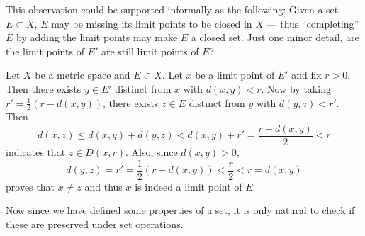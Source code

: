 This observation could be supported informally as the following:
Given a set \(E\subset X\),
\(E\) may be missing its limit points to be closed in \(X\)
---
thus ``completing'' \(E\) by adding the limit points
may make \(E\) a closed set.
Just one minor detail,
are the limit points of \(E'\) are still limit points of \(E\)?

\begin{example}
    \label{exm:limptclosed}
    Let \(X\) be a metric space and \(E\subset X\).
    Let \(x\) be a limit point of \(E'\) and fix \(r>0\).
    Then there exists \(y\in E'\) distinct from \(x\) with \(d(x,y)<r\).
    Now by taking \(r'=\frac{1}{2}(r-d(x,y))\),
    there exists \(z\in E\) distinct from \(y\) with \(d(y,z)<r'\).
    Then
    \[
        d(x,z)
        \le d(x,y)+d(y,z)
        <d(x,y)+r'
        =\frac{r+d(x,y)}{2}
        <r
    \]
    indicates that \(z\in D(x,r)\).
    Also, since \(d(x,y)>0\),
    \[
        d(y,z)
        =r'
        =\frac{1}{2}(r-d(x,y))
        <\frac{r}{2}
        <r
        =d(x,y)
    \]
    proves that \(x\neq z\)
    and thus \(x\) is indeed a limit point of \(E\).
\end{example}

Now since we have defined some properties of a set,
it is only natural to check
if these are preserved under set operations.

